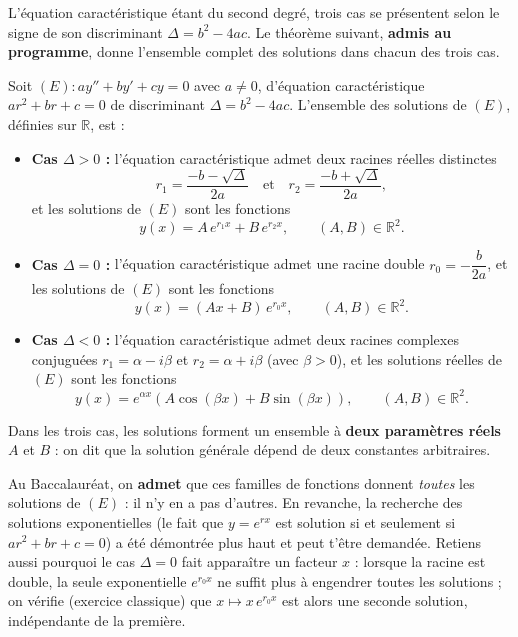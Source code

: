 \documentclass[11pt]{article}
\begin{document}
L'équation caractéristique étant du second degré, trois cas se présentent selon le signe de son discriminant $\Delta = b^2 - 4ac$. Le théorème suivant, \textbf{admis au programme}, donne l'ensemble complet des solutions dans chacun des trois cas.

\begin{propriete}[Solutions de $ay'' + by' + cy = 0$ (théorème admis)]
Soit $(E) : ay'' + by' + cy = 0$ avec $a \neq 0$, d'équation caractéristique $ar^2 + br + c = 0$ de discriminant $\Delta = b^2 - 4ac$. L'ensemble des solutions de $(E)$, définies sur $\mathbb{R}$, est :

\begin{itemize}
\item \textbf{Cas $\Delta > 0$ :} l'équation caractéristique admet deux racines réelles distinctes
\[ r_1 = \frac{-b - \sqrt{\Delta}}{2a} \quad \text{et} \quad r_2 = \frac{-b + \sqrt{\Delta}}{2a}, \]
et les solutions de $(E)$ sont les fonctions
\[ y(x) = A\,e^{r_1 x} + B\,e^{r_2 x}, \qquad (A, B) \in \mathbb{R}^2. \]

\item \textbf{Cas $\Delta = 0$ :} l'équation caractéristique admet une racine double $r_0 = -\dfrac{b}{2a}$, et les solutions de $(E)$ sont les fonctions
\[ y(x) = (Ax + B)\,e^{r_0 x}, \qquad (A, B) \in \mathbb{R}^2. \]

\item \textbf{Cas $\Delta < 0$ :} l'équation caractéristique admet deux racines complexes conjuguées $r_1 = \alpha - i\beta$ et $r_2 = \alpha + i\beta$ (avec $\beta > 0$), et les solutions réelles de $(E)$ sont les fonctions
\[ y(x) = e^{\alpha x}\left(A\cos(\beta x) + B\sin(\beta x)\right), \qquad (A, B) \in \mathbb{R}^2. \]
\end{itemize}

Dans les trois cas, les solutions forment un ensemble à \textbf{deux paramètres réels} $A$ et $B$ : on dit que la solution générale dépend de deux constantes arbitraires.
\end{propriete}

\begin{attention}
Au Baccalauréat, on \textbf{admet} que ces familles de fonctions donnent \emph{toutes} les solutions de $(E)$ : il n'y en a pas d'autres. En revanche, la recherche des solutions exponentielles (le fait que $y = e^{rx}$ est solution si et seulement si $ar^2 + br + c = 0$) a été démontrée plus haut et peut t'être demandée. Retiens aussi pourquoi le cas $\Delta = 0$ fait apparaître un facteur $x$ : lorsque la racine est double, la seule exponentielle $e^{r_0 x}$ ne suffit plus à engendrer toutes les solutions ; on vérifie (exercice classique) que $x \mapsto x\,e^{r_0 x}$ est alors une seconde solution, indépendante de la première.
\end{attention}
\end{document}
